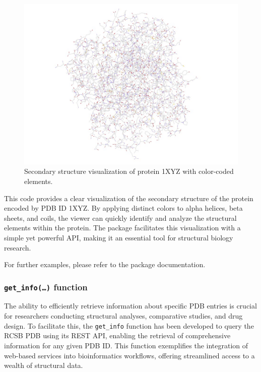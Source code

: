 \begin{figure}[H]

{\centering \includegraphics[width=1\linewidth,]{figures/figure7} 

}

\caption{Secondary structure visualization of protein 1XYZ with color-coded elements.}\label{fig:figure7}
\end{figure}

This code provides a clear visualization of the secondary structure of the protein encoded by PDB ID 1XYZ. By applying distinct colors to alpha helices, beta sheets, and coils, the viewer can quickly identify and analyze the structural elements within the protein. The  package facilitates this visualization with a simple yet powerful API, making it an essential tool for structural biology research.

For further examples, please refer to the package documentation.

\subsubsection{\texorpdfstring{\texttt{get\_info(…)} function}{get\_info(\ldots) function}}\label{get_info-function}

The ability to efficiently retrieve information about specific PDB entries is crucial for researchers conducting structural analyses, comparative studies, and drug design. To facilitate this, the \texttt{get\_info} function has been developed to query the RCSB PDB using its REST API, enabling the retrieval of comprehensive information for any given PDB ID. This function exemplifies the integration of web-based services into bioinformatics workflows, offering streamlined access to a wealth of structural data.

